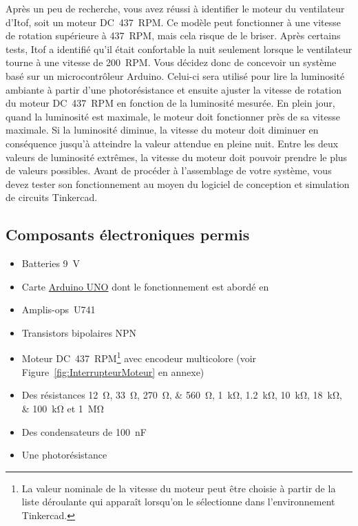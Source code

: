 \documentclass[english,french,12pt]{article}
\begin{document}
Après un peu de recherche, vous avez réussi à identifier le moteur du ventilateur d’Itof, soit un moteur DC~437~RPM. Ce modèle peut fonctionner à une vitesse de rotation supérieure à 437~RPM, mais cela risque de le briser. Après certains tests, Itof a identifié qu’il était confortable la nuit seulement lorsque le ventilateur tourne à une vitesse de 200~RPM. Vous décidez donc de concevoir un système basé sur un microcontrôleur Arduino. Celui-ci sera utilisé pour lire la luminosité ambiante à partir d’une photorésistance et ensuite ajuster la vitesse de rotation du moteur DC~437~RPM en fonction de la luminosité mesurée. En plein jour, quand la luminosité est maximale, le moteur doit fonctionner près de sa vitesse maximale. Si la luminosité diminue, la vitesse du moteur doit diminuer en conséquence jusqu’à atteindre la valeur attendue en pleine nuit. Entre les deux valeurs de luminosité extrêmes, la vitesse du moteur doit pouvoir prendre le plus de valeurs possibles. Avant de procéder à l’assemblage de votre système, vous devez tester son fonctionnement au moyen du logiciel de conception et simulation de circuits Tinkercad.
\vspace{-1em}

\subsection*{Composants électroniques permis} 
\begin{itemize}
    \item Batteries \SI{9}{\volt}
    \item Carte \href{https://www.arduino.cc/en/Guide/ArduinoUno}{Arduino UNO} dont le fonctionnement est abordé en 
    \item Amplis-ops~U741
    \item Transistors bipolaires NPN
    \item Moteur DC~437~RPM\footnote{La valeur nominale de la vitesse du moteur peut être choisie à partir de la liste déroulante qui apparaît lorsqu'on le sélectionne dans l’environnement Tinkercad.} avec encodeur multicolore (voir Figure~\ref{fig:InterrupteurMoteur} en annexe)
    \item Des résistances \SIlist[list-final-separator = {, }]{12;33;270;560}{\ohm}, \SIlist[list-final-separator = {, }]{1;1.2;10; 18;100}{\kilo\ohm} et \SI{1}{\mega\ohm}
    \item Des condensateurs de \SI{100}{\nano\farad}
    \item Une photorésistance
\end{itemize}
\vspace{-1em}
\end{document}

